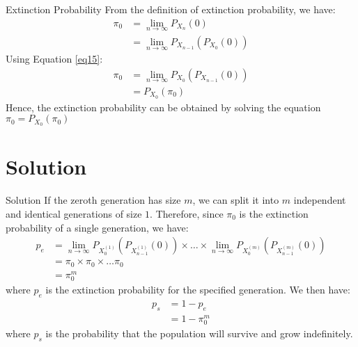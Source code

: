 \documentclass{beamer}
\begin{document}
\begin{frame}{Extinction Probability}
From the definition of extinction probability, we have: 
\begin{align}
    \pi_0 &= \lim_{n \rightarrow \infty}  P_{X_n}(0) \\
    &= \lim_{n \rightarrow \infty} P_{X_{n-1}}(P_{X_0}(0))
\end{align}
Using Equation \ref{eq15}:
\begin{align}
     \pi_0 &= \lim_{n \rightarrow \infty}  P_{X_0}(P_{X_{n-1}}(0)) \\
     &= P_{X_0}(\pi_0)
\end{align}
Hence, the extinction probability can be obtained by solving the equation $\pi_0 = P_{X_0}(\pi_0)$
\end{frame}


\section{Solution}
\begin{frame}{Solution}
If the zeroth generation has size $m$, we can split it into $m$ independent and identical generations of size $1$. Therefore, since $\pi_0$ is the extinction probability of a single generation, we have: 
\begin{align}
    p_e &=  \lim_{n \rightarrow \infty} P_{X_0 ^{(1)}}(P_{X_{n-1}^{(1)}}(0)) \times \ldots \times \lim_{n \rightarrow \infty} P_{X_0 ^{(m)}}(P_{X_{n-1}^{(m)}}(0))\\
            &= \pi_0 \times \pi_0 \times \ldots \pi_0 \\
            &= \pi_0^m
 \end{align}
 where $p_e$ is the extinction probability for the specified generation. We then have:
     \begin{align}
    p_s &= 1 - p_e \\
    &= 1 - \pi_0^m 
 \end{align}
 where $p_s$ is the probability that the population will survive and grow indefinitely.


\end{frame}
\end{document}
